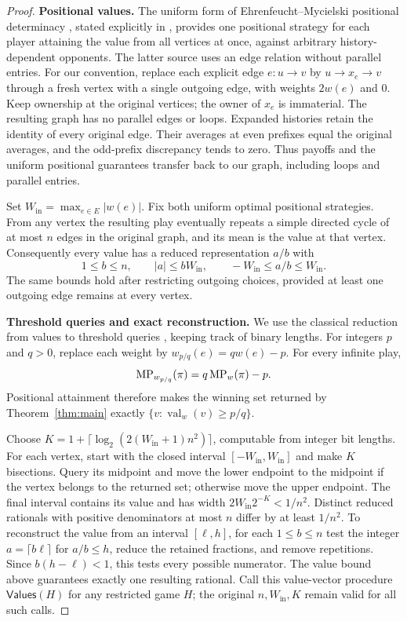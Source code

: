 \begin{proof}
\noindent\textbf{Positional values.}\enspace
The uniform form of Ehrenfeucht--Mycielski positional determinacy
\cite{EhrenfeuchtMycielski1979}, stated explicitly in
\cite[Theorem~1 and the following paragraph]{BrimEtAl2011}, provides
one positional strategy for each player attaining the value from all
vertices at once, against arbitrary history-dependent opponents.
The latter source uses an edge relation without parallel entries.
For our convention, replace each explicit edge $e:u\to v$ by
$u\to x_e\to v$ through a fresh vertex with a single outgoing edge,
with weights $2w(e)$ and $0$. Keep ownership at the original vertices;
the owner of $x_e$ is immaterial. The resulting graph has no parallel
edges or loops. Expanded histories retain the identity of every
original edge. Their averages at even prefixes equal the original
averages, and the odd-prefix discrepancy tends to zero. Thus payoffs
and the uniform positional guarantees transfer back to our graph,
including loops and parallel entries.

Set $W_{\mathrm{in}}=\max_{e\in E}|w(e)|$. Fix both uniform optimal
positional strategies. From any vertex the resulting play eventually
repeats a simple directed cycle of at most $n$ edges in the original
graph, and its mean is the value at that vertex. Consequently every
value has a reduced representation $a/b$ with
\[
 1\le b\le n,\qquad |a|\le bW_{\mathrm{in}},
 \qquad -W_{\mathrm{in}}\le a/b\le W_{\mathrm{in}}.
\]
The same bounds hold after restricting outgoing choices, provided at
least one outgoing edge remains at every vertex.

\par\medskip\noindent\textbf{Threshold queries and exact reconstruction.}\enspace
We use the classical reduction from values to threshold queries
\cite[Section~5.2]{BrimEtAl2011}, keeping track of binary lengths.
For integers $p$ and $q>0$, replace each weight by
$w_{p/q}(e)=qw(e)-p$. For every infinite play,
\[
 \operatorname{MP}_{w_{p/q}}(\pi)=q\operatorname{MP}_w(\pi)-p.
\]
Positional attainment therefore makes the winning set returned by
Theorem~\ref{thm:main} exactly
$\{v:\operatorname{val}_w(v)\ge p/q\}$.

Choose
$K=1+\lceil\log_2(2(W_{\mathrm{in}}+1)n^2)\rceil$, computable from
integer bit lengths. For each vertex, start with the closed interval
$[-W_{\mathrm{in}},W_{\mathrm{in}}]$ and make $K$ bisections. Query
its midpoint and move the lower endpoint to the midpoint if the
vertex belongs to the returned set; otherwise move the upper endpoint.
The final interval contains its value and has width
$2W_{\mathrm{in}}2^{-K}<1/n^2$. Distinct reduced rationals with
positive denominators at most $n$ differ by at least $1/n^2$.
To reconstruct the value from an interval $[\ell,h]$, for each
$1\le b\le n$ test the integer $a=\lceil b\ell\rceil$ for
$a/b\le h$, reduce the retained fractions, and remove repetitions.
Since $b(h-\ell)<1$, this tests every possible numerator.
The value bound above guarantees exactly one resulting rational.
Call this value-vector procedure $\mathsf{Values}(H)$ for any
restricted game $H$; the original $n,W_{\mathrm{in}},K$ remain valid
for all such calls.


\end{proof}
